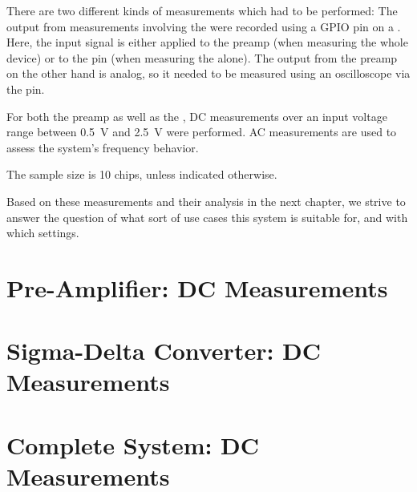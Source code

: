 There are two different  kinds  of measurements which had to be performed: The
output from measurements involving the \sdm were recorded using  a GPIO pin on
a  \raspi.  Here,  the  input  signal  is  either  applied to the preamp (when
measuring the whole  device)  or  to the  pin (when measuring
the \sdm alone). The output from the preamp on the other hand is analog, so it
needed to  be  measured  using  an oscilloscope via the  pin.

For both the preamp as well as the \sdm, DC measurements over an input voltage
range   between   \SI{0.5}{\volt}  and  \SI{2.5}{\volt}  were  performed.   AC
measurements  are  used   to   assess   the   system's   frequency   behavior.

The sample size is 10 chips, unless indicated otherwise.

Based on these  measurements and their analysis in the next chapter, we strive
to answer the question of what sort of use cases this system  is suitable for,
and with which settings.



\section{Pre-Amplifier: DC Measurements}
\label{sec:preAmpDC}



\section{Sigma-Delta Converter: DC Measurements}
\label{sec:sigdelDC}

\section{Complete System: DC Measurements}
\label{sec:systemDC}

